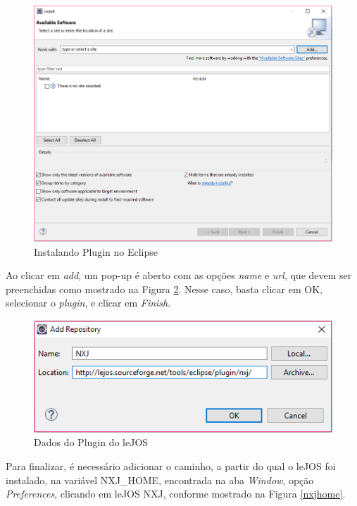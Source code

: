 \FloatBarrier
\begin{figure}[!h]
\centering
\includegraphics[keepaspectratio=true,scale=0.7]{figuras/installNewSoftware.png}
\caption{Instalando Plugin no Eclipse}
\label{installNewSoftware}
\end{figure}
	
	Ao clicar em \textit{add}, um pop-up é aberto com as opções \textit{name} e \textit{url}, que devem ser preenchidas como mostrado na Figura \ref{pluginNXJ}. Nesse caso, basta clicar em OK, selecionar o \textit{plugin}, e clicar em \textit{Finish}.  

\FloatBarrier
\begin{figure}[!h]
\centering
\includegraphics[keepaspectratio=true,scale=0.7]{figuras/pluginNXJ.png}
\caption{Dados do Plugin do leJOS}
\label{pluginNXJ}
\end{figure}
	
	Para finalizar, é necessário adicionar o caminho, a partir do qual o leJOS foi instalado, na variável NXJ\_HOME, encontrada na aba \textit{Window}, opção \textit{Preferences}, clicando em leJOS NXJ, conforme mostrado na Figura \ref{nxjhome}.
		
